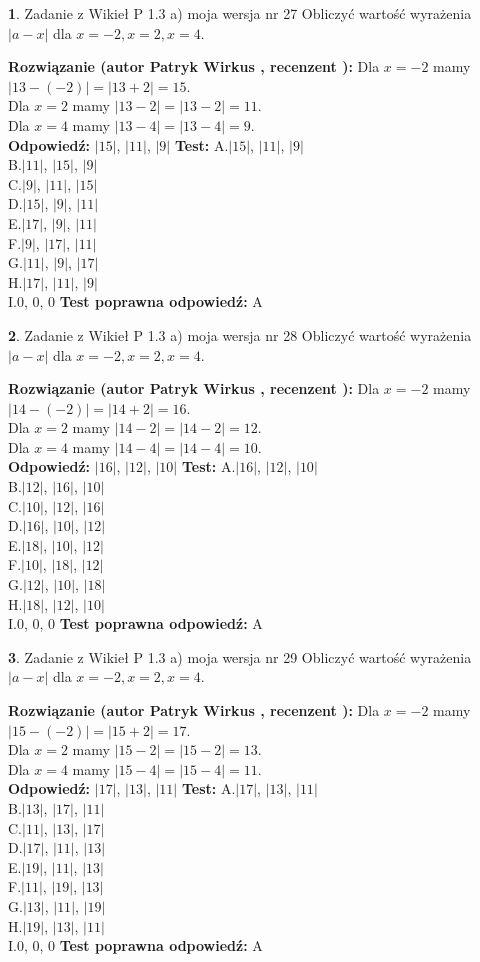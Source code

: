 \documentclass[12pt, a4paper]{article}
\theoremstyle{definition} %
\newtheorem{zad}{}
\newcommand{\zadStart}[1]{\begin{zad}#1\newline}
\newcommand{\zadStop}{\end{zad}}
\newcommand{\rozwStart}[2]{\noindent \textbf{Rozwiązanie (autor #1 , recenzent #2): }\newline}
\newcommand{\rozwStop}{\newline}
\newcommand{\odpStart}{\noindent \textbf{Odpowiedź:}\newline}
\newcommand{\odpStop}{\newline}
\newcommand{\testStart}{\noindent \textbf{Test:}\newline}
\newcommand{\testStop}{\newline}
\newcommand{\kluczStart}{\noindent \textbf{Test poprawna odpowiedź:}\newline}
\newcommand{\kluczStop}{\newline}
\begin{document}
\zadStart{Zadanie z Wikieł P 1.3 a) moja wersja nr 27}
Obliczyć wartość wyrażenia $|a - x|$ dla $x=-2,x=2,x=4$.
\zadStop
\rozwStart{Patryk Wirkus}{}
Dla $x = -2$ mamy $|13 - (-2)| = |13 + 2| = 15$.\\
Dla $x = 2$ mamy $|13 - 2| = |13 - 2| = 11$.\\
Dla $x = 4$ mamy $|13 - 4| = |13 - 4| = 9$.\\
\rozwStop
\odpStart
$|15|$, $|11|$, $|9|$
\odpStop
\testStart
A.$|15|$, $|11|$, $|9|$\\
B.$|11|$, $|15|$, $|9|$\\
C.$|9|$, $|11|$, $|15|$\\
D.$|15|$, $|9|$, $|11|$\\
E.$|17|$, $|9|$, $|11|$\\
F.$|9|$, $|17|$, $|11|$\\
G.$|11|$, $|9|$, $|17|$\\
H.$|17|$, $|11|$, $|9|$\\
I.$0$, $0$, $0$
\testStop
\kluczStart
A
\kluczStop



\zadStart{Zadanie z Wikieł P 1.3 a) moja wersja nr 28}
Obliczyć wartość wyrażenia $|a - x|$ dla $x=-2,x=2,x=4$.
\zadStop
\rozwStart{Patryk Wirkus}{}
Dla $x = -2$ mamy $|14 - (-2)| = |14 + 2| = 16$.\\
Dla $x = 2$ mamy $|14 - 2| = |14 - 2| = 12$.\\
Dla $x = 4$ mamy $|14 - 4| = |14 - 4| = 10$.\\
\rozwStop
\odpStart
$|16|$, $|12|$, $|10|$
\odpStop
\testStart
A.$|16|$, $|12|$, $|10|$\\
B.$|12|$, $|16|$, $|10|$\\
C.$|10|$, $|12|$, $|16|$\\
D.$|16|$, $|10|$, $|12|$\\
E.$|18|$, $|10|$, $|12|$\\
F.$|10|$, $|18|$, $|12|$\\
G.$|12|$, $|10|$, $|18|$\\
H.$|18|$, $|12|$, $|10|$\\
I.$0$, $0$, $0$
\testStop
\kluczStart
A
\kluczStop



\zadStart{Zadanie z Wikieł P 1.3 a) moja wersja nr 29}
Obliczyć wartość wyrażenia $|a - x|$ dla $x=-2,x=2,x=4$.
\zadStop
\rozwStart{Patryk Wirkus}{}
Dla $x = -2$ mamy $|15 - (-2)| = |15 + 2| = 17$.\\
Dla $x = 2$ mamy $|15 - 2| = |15 - 2| = 13$.\\
Dla $x = 4$ mamy $|15 - 4| = |15 - 4| = 11$.\\
\rozwStop
\odpStart
$|17|$, $|13|$, $|11|$
\odpStop
\testStart
A.$|17|$, $|13|$, $|11|$\\
B.$|13|$, $|17|$, $|11|$\\
C.$|11|$, $|13|$, $|17|$\\
D.$|17|$, $|11|$, $|13|$\\
E.$|19|$, $|11|$, $|13|$\\
F.$|11|$, $|19|$, $|13|$\\
G.$|13|$, $|11|$, $|19|$\\
H.$|19|$, $|13|$, $|11|$\\
I.$0$, $0$, $0$
\testStop
\kluczStart
A
\kluczStop
\end{document}
